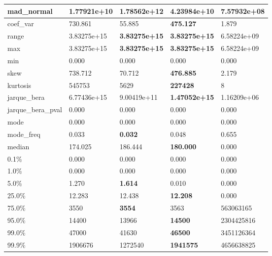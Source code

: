 \begin{table}[H]
\begin{tabular}{|l|m{10em}|m{10em}|m{10em}|m{10em}|}
\hline mad\_normal & 1.77921e+10 & \cellcolor[rgb]{0.9, 0.54, 0.52} 1.78562e+12 & 4.23984e+10 & \bfseries 7.57932e+08 \\
\hline coef\_var & 730.861 & 55.885 & \bfseries 475.127 & \cellcolor[rgb]{0.9, 0.54, 0.52} 1.879 \\
\hline range & 3.83275e+15 & \bfseries 3.83275e+15 & \bfseries 3.83275e+15 & \cellcolor[rgb]{0.9, 0.54, 0.52} 6.58224e+09 \\
\hline max & 3.83275e+15 & \bfseries 3.83275e+15 & \bfseries 3.83275e+15 & \cellcolor[rgb]{0.9, 0.54, 0.52} 6.58224e+09 \\
\hline min & 0.000 & 0.000 & 0.000 & 0.000 \\
\hline skew & 738.712 & 70.712 & \bfseries 476.885 & \cellcolor[rgb]{0.9, 0.54, 0.52} 2.179 \\
\hline kurtosis & 545753 & 5629 & \bfseries 227428 & \cellcolor[rgb]{0.9, 0.54, 0.52} 8 \\
\hline jarque\_bera & 6.77436e+15 & 9.00419e+11 & \bfseries 1.47052e+15 & \cellcolor[rgb]{0.9, 0.54, 0.52} 1.16209e+06 \\
\hline jarque\_bera\_pval & 0.000 & 0.000 & 0.000 & 0.000 \\
\hline mode & 0.000 & 0.000 & 0.000 & 0.000 \\
\hline mode\_freq & 0.033 & \bfseries 0.032 & 0.048 & \cellcolor[rgb]{0.9, 0.54, 0.52} 0.655 \\
\hline median & 174.025 & 186.444 & \bfseries 180.000 & \cellcolor[rgb]{0.9, 0.54, 0.52} 0.000 \\
\hline 0.1\% & 0.000 & 0.000 & 0.000 & 0.000 \\
\hline 1.0\% & 0.000 & 0.000 & 0.000 & 0.000 \\
\hline 5.0\% & 1.270 & \bfseries 1.614 & 0.010 & \cellcolor[rgb]{0.9, 0.54, 0.52} 0.000 \\
\hline 25.0\% & 12.283 & 12.438 & \bfseries 12.208 & \cellcolor[rgb]{0.9, 0.54, 0.52} 0.000 \\
\hline 75.0\% & 3550 & \bfseries 3554 & 3563 & \cellcolor[rgb]{0.9, 0.54, 0.52} 563063165 \\
\hline 95.0\% & 14400 & 13966 & \bfseries 14500 & \cellcolor[rgb]{0.9, 0.54, 0.52} 2304425816 \\
\hline 99.0\% & 47000 & 41630 & \bfseries 46500 & \cellcolor[rgb]{0.9, 0.54, 0.52} 3451126364 \\
\hline 99.9\% & 1906676 & 1272540 & \bfseries 1941575 & \cellcolor[rgb]{0.9, 0.54, 0.52} 4656638825 \\
\hline
\end{tabular}
\end{table}
